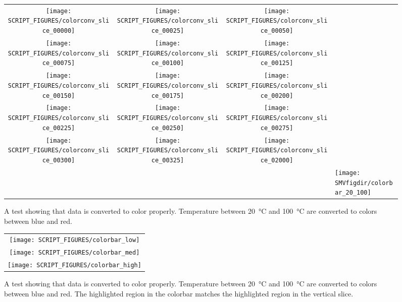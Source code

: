 \documentclass[11pt,twoside]{book}
\begin{document}
\begin{figure}[bph]
\begin{center}
\begin{tabular}{cccl}
 \texttt{[image: SCRIPT\_FIGURES/colorconv\_slice\_00000]}&
 \texttt{[image: SCRIPT\_FIGURES/colorconv\_slice\_00025]}&
 \texttt{[image: SCRIPT\_FIGURES/colorconv\_slice\_00050]}\\
 \texttt{[image: SCRIPT\_FIGURES/colorconv\_slice\_00075]}&
 \texttt{[image: SCRIPT\_FIGURES/colorconv\_slice\_00100]}&
 \texttt{[image: SCRIPT\_FIGURES/colorconv\_slice\_00125]}\\
 \texttt{[image: SCRIPT\_FIGURES/colorconv\_slice\_00150]}&
 \texttt{[image: SCRIPT\_FIGURES/colorconv\_slice\_00175]}&
 \texttt{[image: SCRIPT\_FIGURES/colorconv\_slice\_00200]}\\
 \texttt{[image: SCRIPT\_FIGURES/colorconv\_slice\_00225]}&
 \texttt{[image: SCRIPT\_FIGURES/colorconv\_slice\_00250]}&
 \texttt{[image: SCRIPT\_FIGURES/colorconv\_slice\_00275]}\\
 \texttt{[image: SCRIPT\_FIGURES/colorconv\_slice\_00300]}&
 \texttt{[image: SCRIPT\_FIGURES/colorconv\_slice\_00325]}&
 \texttt{[image: SCRIPT\_FIGURES/colorconv\_slice\_02000]}\\
&&&\raisebox{0.0in}[0pt]{\texttt{[image: \\SMVfigdir/colorbar\_20\_100]}}\\
\end{tabular}
\end{center}
 \caption[A test showing that data is converted to color properly]{
 A test showing that data is converted to color properly.  Temperature
 between \SI{20}{\degreeCelsius} and \SI{100}{\degreeCelsius} are
 converted to colors between blue and red.}
\label{figcolorconv}%
\end{figure}

\begin{figure}[bph]
\begin{center}
\begin{tabular}{c}
 \texttt{[image: SCRIPT\_FIGURES/colorbar\_low]}\\
 \texttt{[image: SCRIPT\_FIGURES/colorbar\_med]}\\
 \texttt{[image: SCRIPT\_FIGURES/colorbar\_high]}\\
 \end{tabular}
\end{center}
 \caption[A test showing that data is converted to color properly]{A
 test showing that data is converted to color properly.  Temperature
 between \SI{20}{\degreeCelsius} and \SI{100}{\degreeCelsius} are
 converted to colors between blue and red.  The highlighted region
 in the colorbar matches the highlighted region in the vertical slice.  }
\label{figcolorconv2}%
\end{figure}
\end{document}
